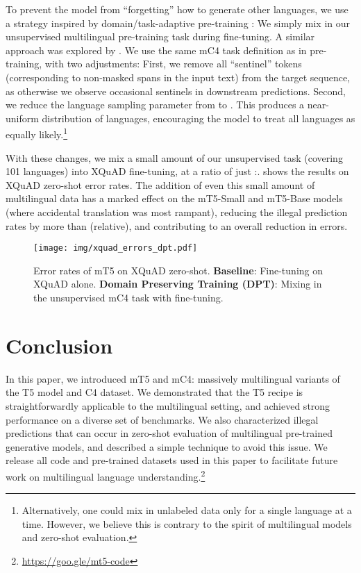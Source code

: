 \documentclass[11pt]{article}
\begin{document}
To prevent the model from ``forgetting'' how to generate other languages, we use a strategy inspired by domain/task-adaptive pre-training \cite{howard2018universal,gururangan2020don}:
We simply mix in our unsupervised multilingual pre-training task during fine-tuning.
A similar approach was explored by \citet{liu2020exploring}.
We use the same mC4 task definition as in pre-training, with two adjustments:
First, we remove all ``sentinel'' tokens (corresponding to non-masked spans in the input text) from the target sequence, as otherwise we observe occasional sentinels in downstream predictions.
Second, we reduce the language sampling parameter  from  to .
This produces a near-uniform distribution of languages, encouraging the model to treat all languages as equally likely.\footnote{Alternatively, one could mix in unlabeled data only for a single language at a time. However, we believe this is contrary to the spirit of multilingual models and zero-shot evaluation.}

With these changes, we mix a small amount of our unsupervised task (covering 101 languages) into XQuAD fine-tuning, at a ratio of just :.  shows the results on XQuAD zero-shot error rates.
The addition of even this small amount of multilingual data has a marked effect on the mT5-Small and mT5-Base models (where accidental translation was most rampant), reducing the illegal prediction rates by more than  (relative), and contributing to an overall reduction in errors.

\begin{figure}
    \centering
    \texttt{[image: img/xquad\_errors\_dpt.pdf]}
    \caption{Error rates of mT5 on XQuAD zero-shot. \textbf{Baseline}: Fine-tuning on XQuAD alone. \textbf{Domain Preserving Training (DPT)}: Mixing in the unsupervised mC4 task with fine-tuning.}
    \label{fig:dpt}
\end{figure}


\section{Conclusion}

In this paper, we introduced mT5 and mC4: massively multilingual variants of the T5 model and C4 dataset.
We demonstrated that the T5 recipe is straightforwardly applicable to the multilingual setting, and achieved strong performance on a diverse set of benchmarks.
We also characterized illegal predictions that can occur in zero-shot evaluation of multilingual pre-trained generative models, and described a simple technique to avoid this issue.
We release all code and pre-trained datasets used in this paper to facilitate future work on multilingual language understanding.\footnote{\url{https://goo.gle/mt5-code}}
\end{document}
